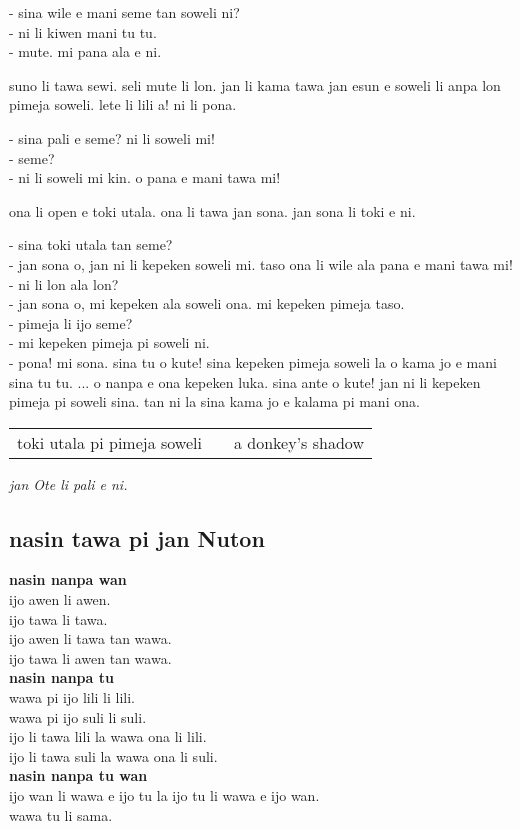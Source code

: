 - sina wile e mani seme tan soweli ni? \\
- ni li kiwen mani tu tu. \\
- mute. mi pana ala e ni.

suno li tawa sewi.
seli mute li lon.
jan li kama tawa jan esun e soweli li anpa lon pimeja soweli.
lete li lili a!
ni li pona.

- sina pali e seme? ni li soweli mi! \\
- seme?          \\
- ni li soweli mi kin. o pana e mani tawa mi!

ona li open e toki utala. ona li tawa jan sona. jan sona li toki e ni.

- sina toki utala tan seme? \\
- jan sona o, jan ni li kepeken soweli mi. taso ona li wile ala pana e mani tawa mi! \\
- ni li lon ala lon? \\
- jan sona o, mi kepeken ala soweli ona. mi kepeken pimeja taso. \\
- pimeja li ijo seme? \\
- mi kepeken pimeja pi soweli ni. \\
- pona! mi sona. sina tu o kute! sina kepeken pimeja soweli la o kama jo e mani sina tu tu. ...
o nanpa e ona kepeken luka. sina ante o kute! jan ni li kepeken pimeja pi soweli sina. tan ni la sina kama jo e kalama pi mani ona.

\begin{supertabular}{p{5,5cm}|ll}
    toki utala pi pimeja soweli &  & a donkey's shadow \\
\end{supertabular}

\textit{jan Ote li pali e ni. \cite{www:olukin:01}}

\newpage

\subsection{nasin tawa pi jan Nuton}
\textbf{nasin nanpa wan}    \\
ijo awen li awen.    \\
ijo tawa li tawa.    \\
ijo awen li tawa tan wawa.    \\
ijo tawa li awen tan wawa.   \\
\textbf{nasin nanpa tu}    \\
wawa pi ijo lili li lili.    \\
wawa pi ijo suli li suli.    \\
ijo li tawa lili la wawa ona li lili.    \\
ijo li tawa suli la wawa ona li suli.       \\
\textbf{nasin nanpa tu wan}    \\
ijo wan li wawa e ijo tu la ijo tu li wawa e ijo wan.    \\
wawa tu li sama.

